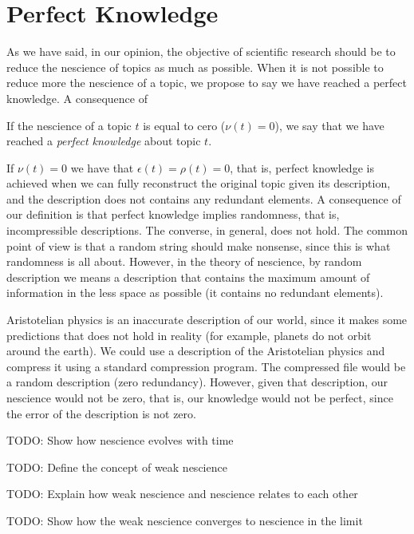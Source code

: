 \section{Perfect Knowledge}

As we have said, in our opinion, the objective of scientific research should be to reduce the nescience of topics as much as possible. When it is not possible to reduce more the nescience of a topic, we propose to say we have reached a perfect knowledge. A consequence of 

\begin{definition}
If the nescience of a topic $t$ is equal to cero ($\nu(t)=0$), we say that we have reached a \emph{perfect knowledge} about topic $t$.
\end{definition}

If $\nu(t)=0$ we have that $\epsilon(t) = \rho(t) = 0$, that is, perfect knowledge is achieved when we can fully reconstruct the original topic given its description, and the description does not contains any redundant elements. A consequence of our definition is that perfect knowledge implies randomness, that is, incompressible descriptions. The converse, in general, does not hold. The common point of view is that a random string should make nonsense, since this is what randomness is all about. However, in the theory of nescience, by random description we means a description that contains the maximum amount of information in the less space as possible (it contains no redundant elements).

\begin{example}
Aristotelian physics is an inaccurate description of our world, since it makes some predictions that does not hold in reality (for example, planets do not orbit around the earth). We could use a description of the Aristotelian physics and compress it using a standard compression program. The compressed file would be a random description (zero redundancy). However, given that description, our nescience would not be zero, that is, our knowledge would not be perfect, since the error of the description is not zero.
\end{example}

{\color{red} TODO: Show how nescience evolves with time}

{\color{red} TODO: Define the concept of weak nescience}

{\color{red} TODO: Explain how weak nescience and nescience relates to each other}

{\color{red} TODO: Show how the weak nescience converges to nescience in the limit}

